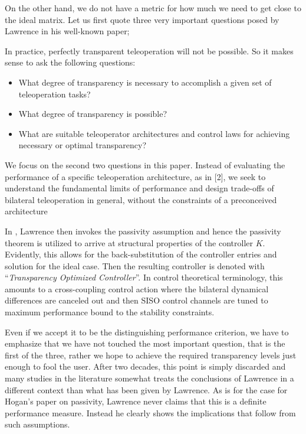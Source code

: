 On the other hand, we do not have a metric for how much we need to get close to the ideal matrix. Let us first quote three 
very important questions posed by Lawrence in his well-known paper;
\begin{displayquote}
In practice, perfectly transparent teleoperation will not be possible. So it makes sense to ask the following questions:
\begin{itemize}
	\item What degree of transparency is necessary to accomplish a given set of teleoperation tasks? 
	\item What degree of transparency is possible?
	\item What are suitable teleoperator architectures and control laws for achieving necessary or optimal transparency?
\end{itemize}
We focus on the second two questions in this paper. Instead of evaluating the performance of a specific teleoperation architecture,
as in [2], we seek to understand the fundamental limits of performance and design trade-offs of bilateral teleoperation in
general, without the constraints of a preconceived architecture
\end{displayquote}
In \cite{lawrence}, Lawrence then invokes the passivity assumption and hence the passivity theorem is utilized to arrive at structural 
properties of the controller $K$. Evidently, this allows for the back-substitution of the controller entries and solution
for the ideal case. Then the resulting controller is denoted with \enquote{\emph{Transparency Optimized Controller}}. In 
control theoretical terminology, this amounts to a cross-coupling control action where the bilateral dynamical differences
are canceled out and then SISO control channels are tuned to maximum performance bound to the stability constraints. 


Even if we accept it to be the distinguishing performance criterion, we have to emphasize that we have not touched the most 
important question, that is the first of the three, rather we hope to achieve the required transparency levels just enough 
to fool the user. After two decades, this point is simply discarded and many studies in the literature somewhat 
treats the conclusions of Lawrence in a different context than what has been given by Lawrence. As is for the case for 
Hogan's paper on passivity, Lawrence never claims that this is a definite performance measure. Instead he clearly shows the 
implications that follow from such assumptions. 


